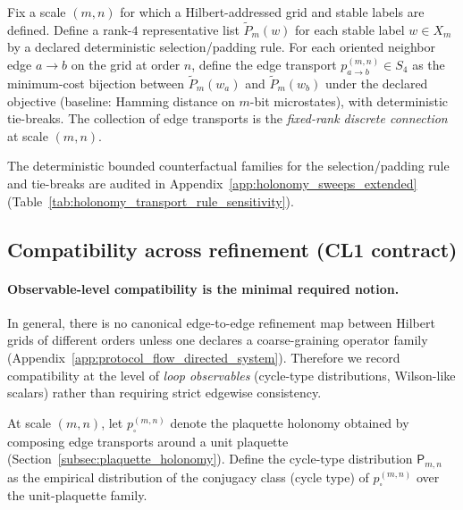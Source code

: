 \begin{definition}
\label{def:fixed_rank_discrete_connection_family}
\MathTag Fix a scale $(m,n)$ for which a Hilbert-addressed grid and stable labels are defined.
Define a rank-$4$ representative list $\widetilde P_{m}(w)$ for each stable label $w\in X_m$ by a declared deterministic selection/padding rule.
For each oriented neighbor edge $a\to b$ on the grid at order $n$, define the edge transport $p^{(m,n)}_{a\to b}\in S_4$ as the minimum-cost bijection between $\widetilde P_m(w_a)$ and $\widetilde P_m(w_b)$ under the declared objective (baseline: Hamming distance on $m$-bit microstates), with deterministic tie-breaks.
The collection of edge transports is the \emph{fixed-rank discrete connection} at scale $(m,n)$.
\end{definition}

\AuditTag The deterministic bounded counterfactual families for the selection/padding rule and tie-breaks are audited in Appendix~\ref{app:holonomy_sweeps_extended} (Table~\ref{tab:holonomy_transport_rule_sensitivity}).

\subsection{Compatibility across refinement (CL1 contract)}
\paragraph{Observable-level compatibility is the minimal required notion.}
\AuditTag In general, there is no canonical edge-to-edge refinement map between Hilbert grids of different orders unless one declares a coarse-graining operator family (Appendix~\ref{app:protocol_flow_directed_system}).
Therefore we record compatibility at the level of \emph{loop observables} (cycle-type distributions, Wilson-like scalars) rather than requiring strict edgewise consistency.

\begin{definition}
\label{def:holonomy_observable_at_scale}
\MathTag At scale $(m,n)$, let $p^{(m,n)}_\square$ denote the plaquette holonomy obtained by composing edge transports around a unit plaquette (Section~\ref{subsec:plaquette_holonomy}).
Define the cycle-type distribution $\mathsf{P}_{m,n}$ as the empirical distribution of the conjugacy class (cycle type) of $p^{(m,n)}_\square$ over the unit-plaquette family.
\end{definition}

